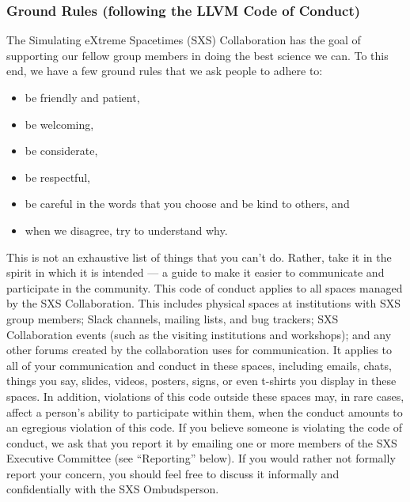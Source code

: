\subsubsection{Ground Rules (following the LLVM Code of Conduct)} 
The Simulating eXtreme Spacetimes (SXS) Collaboration has the goal of
supporting our fellow group members in doing the best science we
can. To this end, we have a few ground rules that we ask people to
adhere to:
\begin{itemize}
  \item be friendly and patient, 
  \item be welcoming, 
  \item be considerate, 
  \item be respectful, 
  \item be careful in the words that you choose and be kind to others, and
  \item when we disagree, try to understand why. 
\end{itemize}

This is not an exhaustive list of things that you can't do. Rather,
take it in the spirit in which it is intended — a guide to make it
easier to communicate and participate in the community. This code of
conduct applies to all spaces managed by the SXS Collaboration. This
includes physical spaces at institutions with SXS group members; Slack
channels, mailing lists, and bug trackers; SXS Collaboration events
(such as the visiting institutions and workshops); and any other
forums created by the collaboration uses for communication. It applies
to all of your communication and conduct in these spaces, including
emails, chats, things you say, slides, videos, posters, signs, or even
t-shirts you display in these spaces. In addition, violations of this
code outside these spaces may, in rare cases, affect a person’s
ability to participate within them, when the conduct amounts to an
egregious violation of this code. If you believe someone is violating
the code of conduct, we ask that you report it by emailing one or more
members of the SXS Executive Committee (see “Reporting” below). If you
would rather not formally report your concern, you should feel free to
discuss it informally and confidentially with the SXS Ombudsperson.

